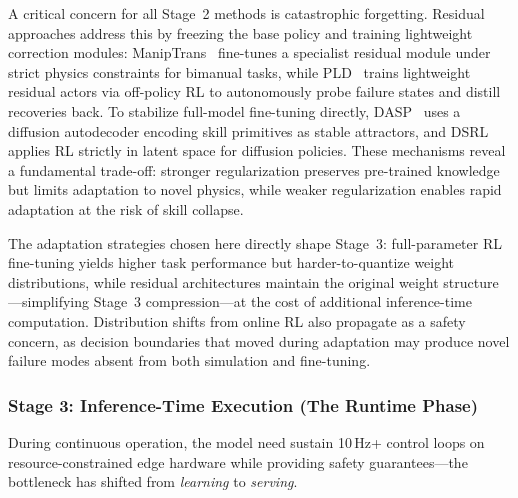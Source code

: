 \documentclass[acmsmall,screen,review,anonymous]{acmart}
\begin{document}
A critical concern for all Stage~2 methods is catastrophic forgetting. Residual approaches address this by freezing the base policy and training lightweight correction modules: ManipTrans~\cite{li2025maniptrans} fine-tunes a specialist residual module under strict physics constraints for bimanual tasks, while PLD~\cite{xiao2025pld} trains lightweight residual actors via off-policy RL to autonomously probe failure states and distill recoveries back. To stabilize full-model fine-tuning directly, DASP~\cite{liu2025dasp} uses a diffusion autodecoder encoding skill primitives as stable attractors, and DSRL~\cite{wagenmaker2025steering} applies RL strictly in latent space for diffusion policies. These mechanisms reveal a fundamental trade-off: stronger regularization preserves pre-trained knowledge but limits adaptation to novel physics, while weaker regularization enables rapid adaptation at the risk of skill collapse.

The adaptation strategies chosen here directly shape Stage~3: full-parameter RL fine-tuning yields higher task performance but harder-to-quantize weight distributions, while residual architectures maintain the original weight structure---simplifying Stage~3 compression---at the cost of additional inference-time computation. Distribution shifts from online RL also propagate as a safety concern, as decision boundaries that moved during adaptation may produce novel failure modes absent from both simulation and fine-tuning.

\subsubsection{Stage 3: Inference-Time Execution (The Runtime Phase)}

During continuous operation, the model need sustain 10\,Hz+ control loops on resource-constrained edge hardware while providing safety guarantees---the bottleneck has shifted from \emph{learning} to \emph{serving}.
\end{document}
